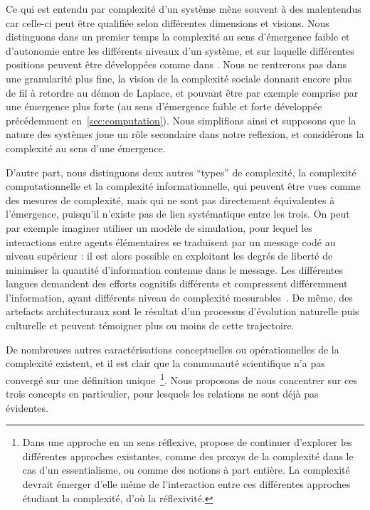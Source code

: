 Ce qui est entendu par complexité d'un système mène souvent à des malentendus car celle-ci peut être qualifiée selon différentes dimensions et visions. Nous distinguons dans un premier temps la complexité au sens d'émergence faible et d'autonomie entre les différents niveaux d'un système, et sur laquelle différentes positions peuvent être développées comme dans \cite{deffuant2015visions}. Nous ne rentrerons pas dans une granularité plus fine, la vision de la complexité sociale donnant encore plus de fil à retordre au démon de Laplace, et pouvant être par exemple comprise par une émergence plus forte (au sens d'émergence faible et forte développée précédemment en~\ref{sec:computation}). Nous simplifions ainsi et supposons que la nature des systèmes joue un rôle secondaire dans notre reflexion, et considérons la complexité au sens d'une émergence.


D'autre part, nous distinguons deux autres ``types'' de complexité, la complexité computationnelle et la complexité informationnelle, qui peuvent être vues comme des mesures de complexité, mais qui ne sont pas directement équivalentes à l'émergence, puisqu'il n'existe pas de lien systématique entre les trois. On peut par exemple imaginer utiliser un modèle de simulation, pour lequel les interactions entre agents élémentaires se traduisent par un message codé au niveau supérieur : il est alors possible en exploitant les degrés de liberté de minimiser la quantité d'information contenue dans le message. Les différentes langues demandent des efforts cognitifs différents et compressent différemment l'information, ayant différents niveau de complexité mesurables~\cite{febres2013complexity}. De même, des artefacts architecturaux sont le résultat d'un processus d'évolution naturelle puis culturelle et peuvent témoigner plus ou moins de cette trajectoire.

De nombreuses autres caractérisations conceptuelles ou opérationnelles de la complexité existent, et il est clair que la communauté scientifique n'a pas convergé sur une définition unique~\cite{chu2008criteria}\footnote{Dans une approche en un sens réflexive, \cite{chu2008criteria} propose de continuer d'explorer les différentes approches existantes, comme des proxys de la complexité dans le cas d'un essentialisme, ou comme des notions à part entière. La complexité devrait émerger d'elle même de l'interaction entre ces différentes approches étudiant la complexité, d'où la réflexivité.}. Nous proposons de nous concentrer sur ces trois concepts en particulier, pour lesquels les relations ne sont déjà pas évidentes.


